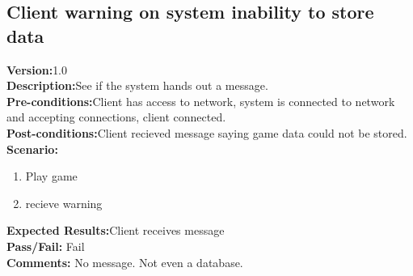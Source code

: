 \documentclass[12pt]{article}
\begin{document}
\subsection{Client warning on system inability to store data}
\textbf{Version:}1.0\\
\textbf{Description:}See if the system hands out a message.\\
\textbf{Pre-conditions:}Client has access to network, system is connected to network and accepting connections, client connected.\\
\textbf{Post-conditions:}Client recieved message saying game data could not be stored.\\
\textbf{Scenario:}
\begin{enumerate}
 \item Play game
 \item recieve warning
\end{enumerate}
\textbf{Expected Results:}Client receives message\\
\textbf{Pass/Fail:} Fail\\
\textbf{Comments:} No message. Not even a database.\\
\end{document}
